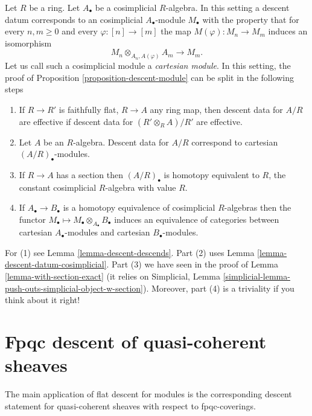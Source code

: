 \begin{remark}
\label{remark-homotopy-equivalent-cosimplicial-algebras}
Let $R$ be a ring. Let $A_\bullet$ be a cosimplicial $R$-algebra.
In this setting a descent datum corresponds to an cosimplicial
$A_\bullet$-module $M_\bullet$ with the property that for
every $n, m \geq 0$ and every $\varphi : [n] \to [m]$ the
map $M(\varphi) : M_n \to M_m$ induces an isomorphism
$$
M_n \otimes_{A_n, A(\varphi)} A_m \longrightarrow M_m.
$$
Let us call such a cosimplicial module a {\it cartesian module}.
In this setting, the proof of Proposition \ref{proposition-descent-module}
can be split in the following steps
\begin{enumerate}
\item If $R \to R'$ is faithfully flat, $R \to A$ any ring map,
then descent data for $A/R$ are effective if
descent data for $(R' \otimes_R A)/R'$ are effective.
\item Let $A$ be an $R$-algebra. Descent data for $A/R$ correspond
to cartesian $(A/R)_\bullet$-modules.
\item If $R \to A$ has a section then $(A/R)_\bullet$ is homotopy
equivalent to $R$, the constant cosimplicial
$R$-algebra with value $R$.
\item If $A_\bullet \to B_\bullet$ is a homotopy equivalence of
cosimplicial $R$-algebras then the functor
$M_\bullet \mapsto M_\bullet \otimes_{A_\bullet} B_\bullet$
induces an equivalence of categories between cartesian
$A_\bullet$-modules and cartesian $B_\bullet$-modules.
\end{enumerate}
For (1) see Lemma \ref{lemma-descent-descends}.
Part (2) uses Lemma \ref{lemma-descent-datum-cosimplicial}.
Part (3) we have seen in the proof of Lemma \ref{lemma-with-section-exact}
(it relies on Simplicial,
Lemma \ref{simplicial-lemma-push-outs-simplicial-object-w-section}).
Moreover, part (4) is a triviality if you think about it right!
\end{remark}









\section{Fpqc descent of quasi-coherent sheaves}
\label{section-fpqc-descent-quasi-coherent}

\noindent
The main application of flat descent for modules is
the corresponding descent statement for quasi-coherent
sheaves with respect to fpqc-coverings.

